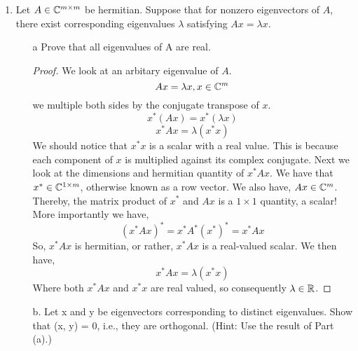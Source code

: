 \documentclass{article}
\begin{document}
\begin{enumerate}
\begin{enumerate}
\begin{proof}
\begin{enumerate}
$\lambda \in \R$.
We have since $A, \I, \lambda$ are all real-valued, that the conjugate transpose of $(A - \lambda\I)^*$ is equal to the transpose of the same matrix quantity. i.e.
\[
    (A - \lambda\I)^* = (A - \lambda\I)^T = A^T - \lambda\I = A^* - \lambda\I
\]
Therefore we can write, 
\[
    \text{det}(A - \lambda\I) = \text{det}(A^* - \lambda\I) = 0
\]
We can immediately see that any real eigenvalue of $A$ is also an eigenvalue of $A^*$. 

\item[Case 2:] 
$\lambda \in \C$, We again look at the conjugate transpose,
\[
    (A - \lambda\I)^* = (A^* - \overline{\lambda}\I)
\]


\end{enumerate}

\end{proof}

\item
Let $A \in \mathbb{C}^{m \times m}$ be hermitian. Suppose that for nonzero eigenvectors of $A$, there exist corresponding eigenvalues $\lambda$ satisfying $Ax = \lambda x$.

\begin{enumerate}
\item[a]
Prove that all eigenvalues of A are real.

\begin{proof}
    We look at an arbitary eigenvalue of $A$. 
\[
    Ax = \lambda x, x \in \mathbb{C}^m
\]
we multiple both sides by the conjugate transpose of $x$.
\[
    x^*(Ax) = x^*(\lambda x)
\]
\[  
    x^*Ax = \lambda(x^*x)
\]
We should notice that $x^*x$ is a scalar with a real value. This is because each component of $x$ is multiplied against its complex conjugate. Next we look at the dimensions and hermitian quantity of $x^*Ax$. We have that $x^* \in \mathbb{C}^{1 \times m}$, otherwise known as a row vector. We also have, $Ax \in \mathbb{C}^m$. Thereby, the matrix product of $x^*$ and $Ax$ is a $1\times 1$ quantity, a scalar! More importantly we have, 
\[
    (x^*Ax)^* = x^*A^*(x^*)^* = x^*Ax
\]
So, $x^*Ax$ is hermitian, or rather, $x^*Ax$ is a real-valued scalar. We then have, 
\[
    x^*Ax = \lambda(x^*x)
\]
Where both $x^*Ax$ and $x^*x$ are real valued, so consequently $\lambda \in \R$.
\end{proof}

\item[b.]
Let x and y be eigenvectors corresponding to distinct eigenvalues.
Show that (x, y) = 0, i.e., they are orthogonal. (Hint: Use the result
of Part (a).)

\end{enumerate}


    \end{enumerate}
\end{enumerate}
\end{document}
